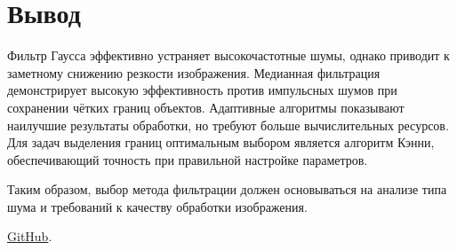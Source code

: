 \documentclass[a4paper,12pt]{article}
\begin{document}
	\section{Вывод}
	
	Фильтр Гаусса эффективно устраняет высокочастотные шумы, однако приводит к заметному снижению резкости изображения. Медианная фильтрация демонстрирует высокую эффективность против импульсных шумов при сохранении чётких границ объектов. Адаптивные алгоритмы показывают наилучшие результаты обработки, но требуют больше вычислительных ресурсов. Для задач выделения границ оптимальным выбором является алгоритм Кэнни, обеспечивающий точность при правильной настройке параметров.
	
	Таким образом, выбор метода фильтрации должен основываться на анализе типа шума и требований к качеству обработки изображения.
	
	\href{https://github.com/decadeos/ITMO/tree/master/2_course/texViz/lab3}{GitHub}.
\end{document}
